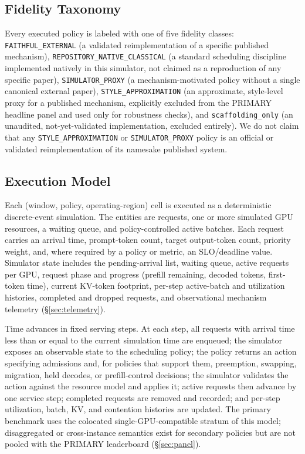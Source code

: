 \subsection{Fidelity Taxonomy}
\label{sec:fidelity}

Every executed policy is labeled with one of five fidelity classes:
\texttt{FAITHFUL\_EXTERNAL} (a validated reimplementation of a specific
published mechanism), \texttt{REPOSITORY\_NATIVE\_CLASSICAL} (a standard
scheduling discipline implemented natively in this simulator, not claimed
as a reproduction of any specific paper), \texttt{SIMULATOR\_PROXY} (a
mechanism-motivated policy without a single canonical external paper),
\texttt{STYLE\_APPROXIMATION} (an approximate, style-level proxy for a
published mechanism, explicitly excluded from the PRIMARY headline panel
and used only for robustness checks), and \texttt{scaffolding\_only} (an
unaudited, not-yet-validated implementation, excluded entirely). We do not
claim that any \texttt{STYLE\_APPROXIMATION} or \texttt{SIMULATOR\_PROXY}
policy is an official or validated reimplementation of its namesake
published system.

\subsection{Execution Model}
\label{sec:execution-model}

Each (window, policy, operating-region) cell is executed as a deterministic
discrete-event simulation. The entities are requests, one or more simulated
GPU resources, a waiting queue, and policy-controlled active batches. Each
request carries an arrival time, prompt-token count, target output-token
count, priority weight, and, where required by a policy or metric, an
SLO/deadline value. Simulator state includes the pending-arrival list,
waiting queue, active requests per GPU, request phase and progress
(prefill remaining, decoded tokens, first-token time), current KV-token
footprint, per-step active-batch and utilization histories, completed and
dropped requests, and observational mechanism telemetry
(\S\ref{sec:telemetry}).

Time advances in fixed serving steps. At each step, all requests with
arrival time less than or equal to the current simulation time are enqueued;
the simulator exposes an observable state to the scheduling policy; the
policy returns an action specifying admissions and, for policies that support
them, preemption, swapping, migration, held decodes, or prefill-control
decisions; the simulator validates the action against the resource model and
applies it; active requests then advance by one service step; completed
requests are removed and recorded; and per-step utilization, batch, KV, and
contention histories are updated. The primary benchmark uses the colocated
single-GPU-compatible stratum of this model; disaggregated or cross-instance
semantics exist for secondary policies but are not pooled with the PRIMARY
leaderboard (\S\ref{sec:panel}).

